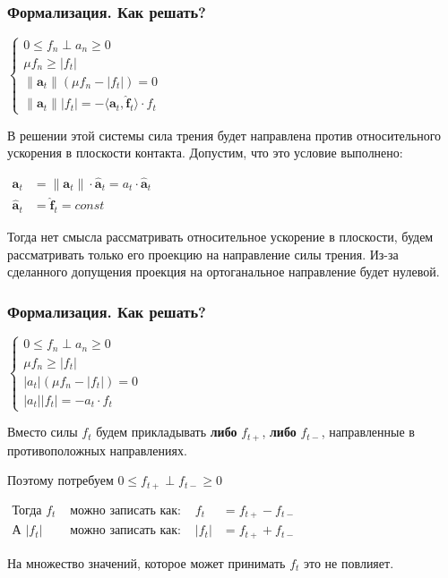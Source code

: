 \documentclass{beamer}
\newcommand{\norm}[1]{\lVert#1\rVert}
\begin{document}
\begin{frame}[t]
\frametitle{Формализация. Как решать?}
    \small \bigskip \bigskip \medskip
    $
    \begin{cases}
        0 \le f_n \perp a_n \ge 0 \\
        \mu f_n \ge |f_t| \\
        \norm{\pmb{a}_t} (\mu f_n - |f_t|) = 0 \\
        \norm{\pmb{a}_t} |f_t| = -\langle \pmb{a}_t, \pmb{\hat{f}}_t \rangle \cdot f_t
    \end{cases}
    $

    \bigskip
    В решении этой системы сила трения будет направлена против относительного ускорения в плоскости контакта.
    Допустим, что это условие выполнено:
    
    \medskip
    $
    \begin{aligned}
    \pmb{a}_t &= \norm{\pmb{a}_t} \cdot \pmb{\hat{a}}_t = a_t \cdot \pmb{\hat{a}}_t \\
    \pmb{\hat{a}}_t &= \pmb{\hat{f}}_t = const
    \end{aligned}
    $

    \medskip
    Тогда нет смысла рассматривать относительное ускорение в плоскости, будем рассматривать только его проекцию на направление силы трения.
    Из-за сделанного допущения проекция на ортоганальное направление будет нулевой.

\end{frame}



\begin{frame}[t]
\frametitle{Формализация. Как решать?}
    \small \bigskip \bigskip \medskip
    $
    \begin{cases}
        0 \le f_n \perp a_n \ge 0 \\
        \mu f_n \ge |f_t| \\
        |a_t| (\mu f_n - |f_t|) = 0 \\
        |a_t| |f_t| = -a_t \cdot f_t
    \end{cases}
    $

    \bigskip
    Вместо силы $f_t$ будем прикладывать \textbf{либо} $f_{t+}$, \textbf{либо} $f_{t-}$, направленные в противоположных направлениях.
    
    \bigskip
    Поэтому потребуем $0 \le f_{t+} \perp f_{t-} \ge 0$
    
    \bigskip
    $\begin{aligned}
    \text{Тогда } f_t& \text{ можно записать как: }& f_t &= f_{t+} - f_{t-} \\
    \text{А } |f_t|& \text{ можно записать как: }& |f_t| &= f_{t+} + f_{t-}
    \end{aligned}$

    \bigskip
    На множество значений, которое может принимать $f_t$ это не повлияет.
\end{frame}
\end{document}
